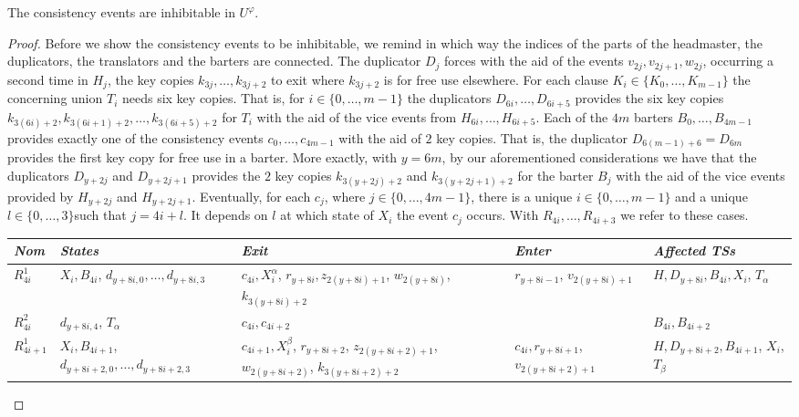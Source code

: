 \documentclass[english]{lipics_hacked}
\begin{document}
\begin{lemma}
\label{lemma:consistency}
The consistency events are inhibitable in $U^\varphi$.
\end{lemma}
%
\begin{proof}
Before we show the consistency events to be inhibitable, we remind in which way the indices of the parts of the headmaster, the duplicators, the translators and the barters are connected.
The duplicator $D_j$ forces with the aid of the events $v_{2j},v_{2j+1},w_{2j}$, occurring a second time in $H_j$, the key copies $k_{3j},\ldots,k_{3j+2}$ to exit where $k_{3j+2}$ is for free use elsewhere.
For each clause $K_i\in \{K_0,\ldots,K_{m-1}\}$ the concerning union $T_i$ needs six key copies.
That is, for $i\in \{0,\dots,m-1\}$ the duplicators $D_{6i},\dots,D_{6i+5}$  provides the six key copies $k_{3(6i)+2},k_{3(6i+1)+2},\dots,k_{3(6i+5)+2}$ for $T_{i}$ with the aid of the vice events from $H_{6i},\dots,H_{6i+5}$.
Each of the $4m$ barters $B_0,\dots,B_{4m-1}$ provides exactly one of the consistency events $c_0,\dots,c_{4m-1}$ with the aid of $2$ key copies.
That is, the duplicator $D_{6(m-1)+6}=D_{6m}$ provides the first key copy for free use in a barter.
More exactly, with $y=6m$, by our aforementioned considerations we have that the duplicators $D_{y+2j}$ and $D_{y+2j+1}$ provides the $2$ key copies $k_{3(y+2j)+2}$ and $k_{3(y+2j+1)+2}$ for the barter $B_j$ with the aid of the vice events provided by $H_{y+2j}$ and $H_{y+2j+1}$.
Eventually, for each $c_j$, where $j\in \{0,\ldots,4m-1\}$, there is a unique $i\in \{0,\dots,m-1\}$ and a unique $l\in \{0,\dots,3\}$such that $j=4i+l$.
It depends on $l$ at which state of $X_i$ the event $c_j$ occurs.
With $R_{4i},\dots, R_{4i+3}$ we refer to these cases.
%
\begin{longtable}{p{0.7cm} p{3cm}   p{2.5cm}    p{2.5cm}      p{2.7cm}  }
\textit{Nom} &\textit{States} & \textit{Exit} & \textit{Enter} & \textit{Affected TSs}  \\ \hline
%
$R_{4i}^1$ & $X_i,B_{4i}$, $d_{y+8i,0},\dots, d_{y+8i,3}$ & $c_{4i},X_i^\alpha$, $r_{y+8i},z_{2(y+8i)+1}$, $w_{2(y+8i)}$, $k_{3(y+8i)+2}$ & $r_{y+8i-1}$, $v_{2(y+8i)+1}$& $H, D_{y+8i},B_{4i},X_i$, $T_\alpha$\\
%
$R_{4i}^2$ & $d_{y+8i,4}$, $T_\alpha$ & $c_{4i},c_{4i+2}$& & $B_{4i},B_{4i+2}$ \\
%
$R_{4i+1}^1$ & $X_i,B_{4i+1}$, $d_{y+8i+2,0},\dots, d_{y+8i+2,3}$ & $c_{4i+1},X_i^\beta$, $r_{y+8i+2}$, $z_{2(y+8i+2)+1}$, $w_{2(y+8i+2)}$, $k_{3(y+8i+2)+2}$ & $c_{4i},r_{y+8i+1}$, $v_{2(y+8i+2)+1}$& $H, D_{y+8i+2},B_{4i+1}$, $X_i$, $T_\beta$ \\

\end{longtable}
\end{proof}
\end{document}
